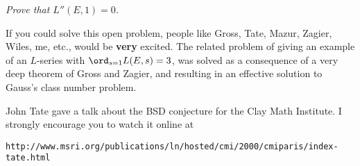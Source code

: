 \documentclass[11pt]{report}
\begin{document}
{\sl Prove that $L''(E,1) = 0$.}\vspace{.7em}

If you could solve this open problem, people like Gross, Tate, Mazur,
Zagier, Wiles, me, etc., would be {\bf very} excited.  The related
problem of giving an example of an $L$-series with
$\ord_{s=1}L(E,s)=3$, was solved as a consequence of a very deep
theorem of Gross and Zagier, and resulting in an effective solution to
Gauss's class number problem.

John Tate gave a talk about the BSD conjecture for the Clay Math
Institute.  I strongly encourage you to watch it online at\vspace{0.5em}

\hspace{-3.5em}
\begin{minipage}{1.1\textwidth}
  \begin{verbatim}
http://www.msri.org/publications/ln/hosted/cmi/2000/cmiparis/index-tate.html
\end{verbatim}
\end{minipage}
\end{document}
